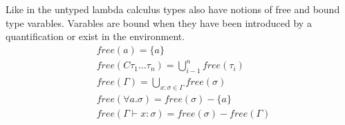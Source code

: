 \documentclass[11pt,oneside,a4paper]{report}
\begin{document}
Like in the untyped lambda calculus types also have notions of free and bound type varables.
Varables are bound when they have been introduced by a quantification or exist in the environment.
\begin{align}
	 & \textit{free}(a) = \{ a \}                                                              \\
	 & \textit{free}(C \tau_1 \dots \tau_n ) = \bigcup_{i-1}^n \textit{free}(\tau_i)           \\
	 & \textit{free}(\Gamma) = \bigcup_{x:\sigma \in \Gamma} \textit{free}(\sigma)             \\
	 & \textit{free}(\forall a . \sigma) = \textit{free}(\sigma) - \{ a \}                     \\
	 & \textit{free}(\Gamma \vdash x : \sigma) = \textit{free}(\sigma) - \textit{free}(\Gamma)
\end{align}
\end{document}
